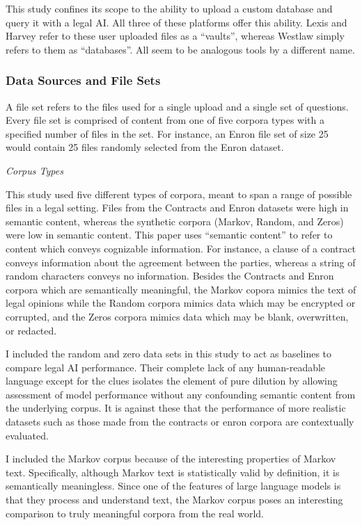 \documentclass[
]{article}
\begin{document}
This study confines its scope to the ability to upload a custom database
and query it with a legal AI. All three of these platforms offer this
ability. Lexis and Harvey refer to these user uploaded files as a
``vaults'', whereas Westlaw simply refers to them as ``databases''. All
seem to be analogous tools by a different name.

\subsubsection{Data Sources and File
Sets}\label{data-sources-and-file-sets}

A file set refers to the files used for a single upload and a single set
of questions. Every file set is comprised of content from one of five
corpora types with a specified number of files in the set. For instance,
an Enron file set of size 25 would contain 25 files randomly selected
from the Enron dataset.

\emph{Corpus Types}

This study used five different types of corpora, meant to span a range
of possible files in a legal setting. Files from the Contracts and Enron
datasets were high in semantic content, whereas the synthetic corpora
(Markov, Random, and Zeros) were low in semantic content. This paper
uses ``semantic content'' to refer to content which conveys cognizable
information. For instance, a clause of a contract conveys information
about the agreement between the parties, whereas a string of random
characters conveys no information. Besides the Contracts and Enron
corpora which are semantically meaningful, the Markov copora mimics the
text of legal opinions while the Random corpora mimics data which may be
encrypted or corrupted, and the Zeros corpora mimics data which may be
blank, overwritten, or redacted.

I included the random and zero data sets in this study to act as
baselines to compare legal AI performance. Their complete lack of any
human-readable language except for the clues isolates the element of
pure dilution by allowing assessment of model performance without any
confounding semantic content from the underlying corpus. It is against
these that the performance of more realistic datasets such as those made
from the contracts or enron corpora are contextually evaluated.

I included the Markov corpus because of the interesting properties of
Markov text. Specifically, although Markov text is statistically valid
by definition, it is semantically meaningless. Since one of the features
of large language models is that they process and understand text, the
Markov corpus poses an interesting comparison to truly meaningful
corpora from the real world.
\end{document}
